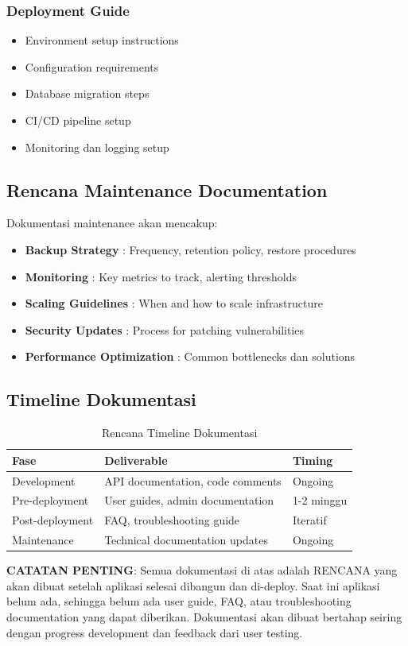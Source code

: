 \subsubsection{Deployment Guide}
\begin{itemize}[leftmargin=*]
    \item Environment setup instructions
    \item Configuration requirements
    \item Database migration steps
    \item CI/CD pipeline setup
    \item Monitoring dan logging setup
\end{itemize}

\subsection{Rencana Maintenance Documentation}

Dokumentasi maintenance akan mencakup:

\begin{itemize}[leftmargin=*]
    \item \textbf{Backup Strategy} : Frequency, retention policy, restore procedures
    \item \textbf{Monitoring} : Key metrics to track, alerting thresholds
    \item \textbf{Scaling Guidelines} : When and how to scale infrastructure
    \item \textbf{Security Updates} : Process for patching vulnerabilities
    \item \textbf{Performance Optimization} : Common bottlenecks dan solutions
\end{itemize}

\subsection{Timeline Dokumentasi}

\begin{table}[H]
\centering
\caption{Rencana Timeline Dokumentasi}
\label{tab:doc_timeline}
\begin{tabularx}{\textwidth}{|l|X|l|}
\hline
\textbf{Fase} & \textbf{Deliverable} & \textbf{Timing} \\
\hline
Development & API documentation, code comments & Ongoing \\
\hline
Pre-deployment & User guides, admin documentation & 1-2 minggu \\
\hline
Post-deployment & FAQ, troubleshooting guide & Iteratif \\
\hline
Maintenance & Technical documentation updates & Ongoing \\
\hline
\end{tabularx}
\end{table}

\textbf{CATATAN PENTING}: Semua dokumentasi di atas adalah RENCANA yang akan dibuat setelah aplikasi selesai dibangun dan di-deploy. Saat ini aplikasi belum ada, sehingga belum ada user guide, FAQ, atau troubleshooting documentation yang dapat diberikan. Dokumentasi akan dibuat bertahap seiring dengan progress development dan feedback dari user testing.
